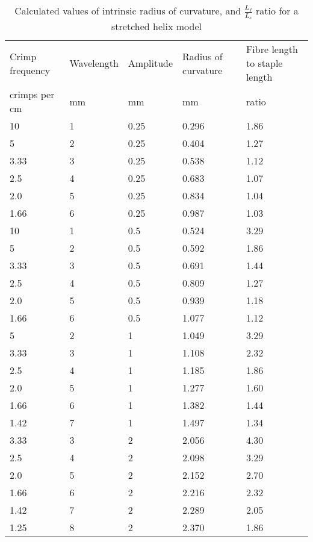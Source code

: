 %

\begin{table}[htp]
\centering
\caption{Calculated values of intrinsic radius of curvature, and $\frac{L_{f}}{L_{s}}$ ratio for a stretched helix model}
\label{tab:str}
\vspace{0.1in}
\begin{tabular}{p{0.6in}|p{0.7in}|p{0.6in}|p{0.6in}|p{0.6in}}  \hline
    Crimp frequency & Wavelength  & Amplitude & Radius of curvature &  Fibre length to staple length \\ 
  crimps per cm & mm & mm & mm &  ratio \\ \hline
 10    & 1 & 0.25 & 0.296 & 1.86 \\
  5    & 2 & 0.25 & 0.404 & 1.27 \\
  3.33 & 3 & 0.25 & 0.538 & 1.12 \\
  2.5  & 4 & 0.25 & 0.683 & 1.07 \\
  2.0  & 5 & 0.25 & 0.834 & 1.04 \\
  1.66 & 6 & 0.25 & 0.987 & 1.03 \\ \hline
 10    & 1 & 0.5 & 0.524 &  3.29 \\
  5    & 2 & 0.5 & 0.592 &  1.86 \\
  3.33 & 3 & 0.5 & 0.691 &  1.44 \\
  2.5  & 4 & 0.5 & 0.809 &  1.27 \\
  2.0  & 5 & 0.5 & 0.939 &  1.18 \\
  1.66 & 6 & 0.5 & 1.077 &  1.12 \\ \hline
  5    & 2 & 1   & 1.049 &  3.29 \\
  3.33 & 3 & 1   & 1.108 &  2.32 \\
  2.5  & 4 & 1   & 1.185 &  1.86 \\
  2.0  & 5 & 1   & 1.277 &  1.60 \\
  1.66 & 6 & 1   & 1.382 &  1.44 \\
  1.42 & 7 & 1   & 1.497 &  1.34 \\ \hline
  3.33 & 3 & 2   & 2.056 &  4.30 \\
  2.5  & 4 & 2   & 2.098 &  3.29 \\
  2.0  & 5 & 2   & 2.152 &  2.70 \\
  1.66 & 6 & 2   & 2.216 &  2.32 \\
  1.42 & 7 & 2   & 2.289 &  2.05 \\
  1.25 & 8 & 2   & 2.370 &  1.86  \\ \hline
\end{tabular}
\end{table}

%
